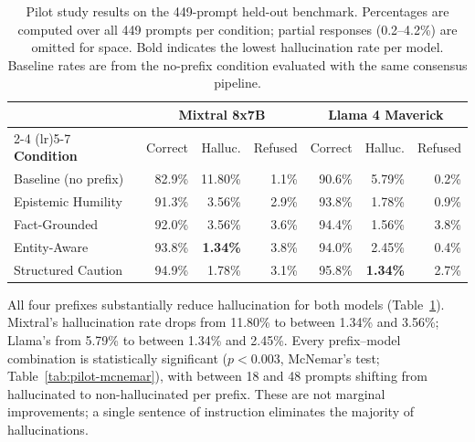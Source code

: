 \begin{table}[ht]
\centering
\small
\begin{tabular}{l rr r rr r}
\toprule
& \multicolumn{3}{c}{\textbf{Mixtral 8x7B}} & \multicolumn{3}{c}{\textbf{Llama 4 Maverick}} \\
\cmidrule(lr){2-4} \cmidrule(lr){5-7}
\textbf{Condition} & Correct & Halluc. & Refused & Correct & Halluc. & Refused \\
\midrule
Baseline (no prefix)   & 82.9\% & 11.80\% & 1.1\% & 90.6\% & 5.79\% & 0.2\% \\[3pt]
Epistemic Humility     & 91.3\% &  3.56\% & 2.9\% & 93.8\% & 1.78\% & 0.9\% \\
Fact-Grounded          & 92.0\% &  3.56\% & 3.6\% & 94.4\% & 1.56\% & 3.8\% \\
Entity-Aware           & 93.8\% & \textbf{1.34\%} & 3.8\% & 94.0\% & 2.45\% & 0.4\% \\
Structured Caution     & 94.9\% & 1.78\% & 3.1\% & 95.8\% & \textbf{1.34\%} & 2.7\% \\
\bottomrule
\end{tabular}
\caption[Pilot study prefix results]{Pilot study results on the 449-prompt held-out benchmark. Percentages are computed over all 449 prompts per condition; partial responses (0.2--4.2\%) are omitted for space.  Bold indicates the lowest hallucination rate per model. Baseline rates are from the no-prefix condition evaluated with the same consensus pipeline.}
\label{tab:pilot-results}
\end{table}

All four prefixes substantially reduce hallucination for both models (Table~\ref{tab:pilot-results}). Mixtral's hallucination rate drops from 11.80\% to between 1.34\% and 3.56\%; Llama's from 5.79\% to between 1.34\% and 2.45\%.  Every prefix--model combination is statistically significant ($p < 0.003$, McNemar's test; Table~\ref{tab:pilot-mcnemar}), with between 18 and 48 prompts shifting from hallucinated to non-hallucinated per prefix. These are not marginal improvements; a single sentence of instruction eliminates the majority of hallucinations.


